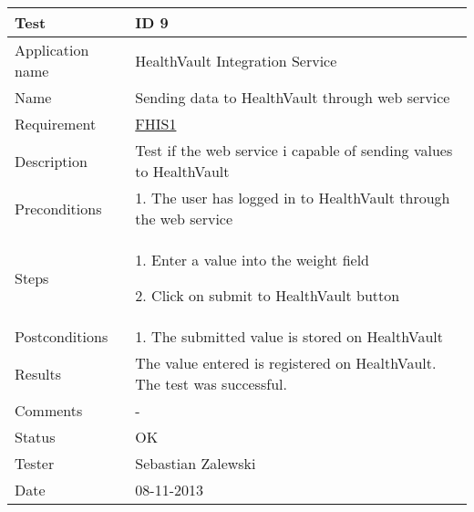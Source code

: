 \begin{table}
\begin{center}
\begin{tabular}{ | l | p{10cm} | }
	\hline
	\textbf{Test}	&	\textbf{ID 9} \\
	\hline\noalign{\smallskip}\noalign{\smallskip}\hline
	Application name	& HealthVault Integration Service \\
	Name				& Sending data to HealthVault through web service \\
	Requirement			& \hyperref[table:reqwebservice]{FHIS1} \\
	Description			& Test if the web service i capable of sending values to HealthVault \\
	Preconditions		&	\par 1. The user has logged in to HealthVault through the web service \\
	Steps 				&	\par 1. Enter a value into the weight field
							\par 2. Click on submit to HealthVault button \\
	Postconditions		&	\par 1. The submitted value is stored on HealthVault \\
	Results				& The value entered is registered on HealthVault.
						  The test was successful. \\
	Comments			& - \\
	Status				& OK \\
	Tester				& Sebastian Zalewski \\
	Date				& 08-11-2013 \\
	\hline
\end{tabular}
\end{center}
\end{table}

